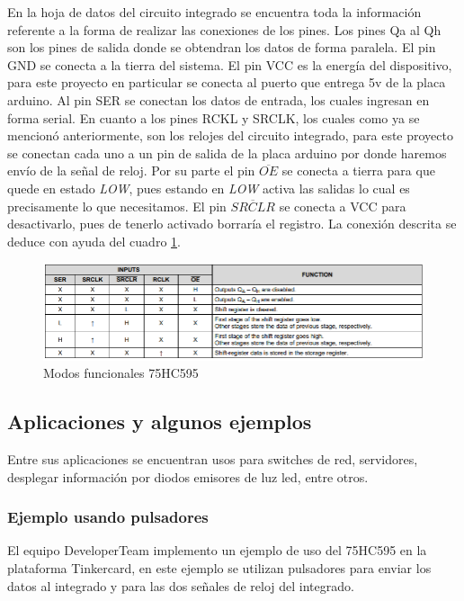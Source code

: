 \documentclass{article}
\begin{document}
En la hoja de datos del circuito integrado se encuentra toda la información referente a la forma de realizar las conexiones de los pines.
Los pines Qa al Qh son los pines de salida donde se obtendran los datos de forma paralela. El pin GND se conecta a la tierra del sistema. El pin VCC es la energía del dispositivo, para este proyecto en particular se conecta al puerto que entrega 5v de la placa arduino. Al pin SER se conectan los datos de entrada, los cuales ingresan en forma serial. En cuanto a los pines RCKL y SRCLK, los cuales como ya se mencionó anteriormente, son los relojes del circuito integrado, para este proyecto se conectan cada uno a un pin de salida de la placa arduino por donde haremos envío de la señal de reloj. Por su parte el pin $\overline{OE}$ se conecta a tierra para que quede en estado \textit{LOW}, pues estando en \textit{LOW} activa las salidas lo cual es precisamente lo que necesitamos. El pin $\overline{SRCLR}$ se conecta a VCC para desactivarlo, pues de tenerlo activado borraría el registro. 
La conexión descrita se deduce con ayuda del cuadro \ref{fig:Modos}.


    \begin{figure}[h]
    \includegraphics[width=12cm]{imagen/Modos.png}
    \centering
    \caption{Modos funcionales 75HC595\footnotemark}
    \label{fig:Modos}
    \end{figure}
    

    
    
\subsection{Aplicaciones y algunos ejemplos}
Entre sus aplicaciones se encuentran usos para switches de red, servidores, desplegar información por diodos emisores de luz led, entre otros.

\subsubsection{Ejemplo usando pulsadores}
El equipo DeveloperTeam implemento un ejemplo de uso del 75HC595 en la plataforma Tinkercard, en este ejemplo se utilizan pulsadores para enviar los datos al integrado y para las dos señales de reloj del integrado.
\end{document}
